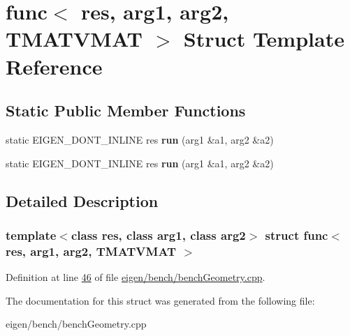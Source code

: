 \hypertarget{structfunc_3_01res_00_01arg1_00_01arg2_00_01_t_m_a_t_v_m_a_t_01_4}{}\section{func$<$ res, arg1, arg2, T\+M\+A\+T\+V\+M\+AT $>$ Struct Template Reference}
\label{structfunc_3_01res_00_01arg1_00_01arg2_00_01_t_m_a_t_v_m_a_t_01_4}
\subsection*{Static Public Member Functions}
\begin{DoxyCompactItemize}
\item 
\mbox{\label{structfunc_3_01res_00_01arg1_00_01arg2_00_01_t_m_a_t_v_m_a_t_01_4_a6e8dcd57f976d16f361a8ec8e7e13525}} 
static E\+I\+G\+E\+N\+\_\+\+D\+O\+N\+T\+\_\+\+I\+N\+L\+I\+NE res {\bfseries run} (arg1 \&a1, arg2 \&a2)
\item 
\mbox{\label{structfunc_3_01res_00_01arg1_00_01arg2_00_01_t_m_a_t_v_m_a_t_01_4_a6e8dcd57f976d16f361a8ec8e7e13525}} 
static E\+I\+G\+E\+N\+\_\+\+D\+O\+N\+T\+\_\+\+I\+N\+L\+I\+NE res {\bfseries run} (arg1 \&a1, arg2 \&a2)
\end{DoxyCompactItemize}


\subsection{Detailed Description}
\subsubsection*{template$<$class res, class arg1, class arg2$>$\newline
struct func$<$ res, arg1, arg2, T\+M\+A\+T\+V\+M\+A\+T $>$}



Definition at line \hyperlink{eigen_2bench_2bench_geometry_8cpp_source_l00046}{46} of file \hyperlink{eigen_2bench_2bench_geometry_8cpp_source}{eigen/bench/bench\+Geometry.\+cpp}.



The documentation for this struct was generated from the following file\+:\begin{DoxyCompactItemize}
\item 
eigen/bench/bench\+Geometry.\+cpp\end{DoxyCompactItemize}
